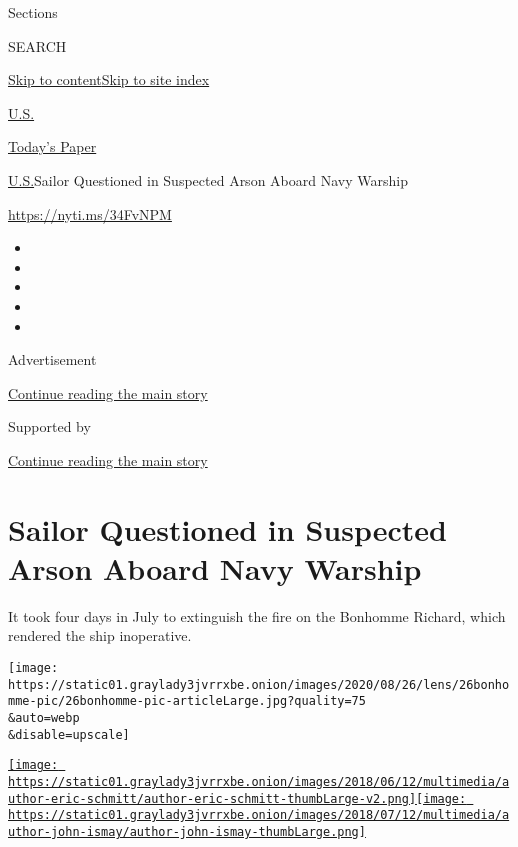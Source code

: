 Sections

SEARCH

\protect\hyperlink{site-content}{Skip to
content}\protect\hyperlink{site-index}{Skip to site index}

\href{https://www.nytimes3xbfgragh.onion/section/us}{U.S.}

\href{https://myaccount.nytimes3xbfgragh.onion/auth/login?response_type=cookie\&client_id=vi}{}

\href{https://www.nytimes3xbfgragh.onion/section/todayspaper}{Today's
Paper}

\href{/section/us}{U.S.}\textbar{}Sailor Questioned in Suspected Arson
Aboard Navy Warship

\url{https://nyti.ms/34FvNPM}

\begin{itemize}
\item
\item
\item
\item
\item
\end{itemize}

Advertisement

\protect\hyperlink{after-top}{Continue reading the main story}

Supported by

\protect\hyperlink{after-sponsor}{Continue reading the main story}

\hypertarget{sailor-questioned-in-suspected-arson-aboard-navy-warship}{%
\section{Sailor Questioned in Suspected Arson Aboard Navy
Warship}\label{sailor-questioned-in-suspected-arson-aboard-navy-warship}}

It took four days in July to extinguish the fire on the Bonhomme
Richard, which rendered the ship inoperative.

\texttt{[image: https://static01.graylady3jvrrxbe.onion/images/2020/08/26/lens/26bonhomme-pic/26bonhomme-pic-articleLarge.jpg?quality=75\\\&auto=webp\\\&disable=upscale]}

\href{https://www.nytimes3xbfgragh.onion/by/eric-schmitt}{\texttt{[image: https://static01.graylady3jvrrxbe.onion/images/2018/06/12/multimedia/author-eric-schmitt/author-eric-schmitt-thumbLarge-v2.png]}}\href{https://www.nytimes3xbfgragh.onion/by/john-ismay}{\texttt{[image: https://static01.graylady3jvrrxbe.onion/images/2018/07/12/multimedia/author-john-ismay/author-john-ismay-thumbLarge.png]}}

